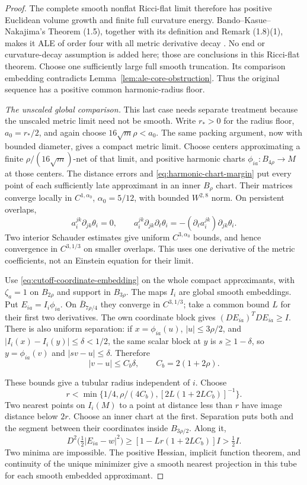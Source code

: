 \documentclass[11pt]{article}
\numberwithin{equation}{section}
\theoremstyle{definition}
\theoremstyle{remark}
\begin{document}
\begin{proof}
The complete smooth nonflat Ricci-flat limit therefore has
positive Euclidean volume growth and finite full curvature
energy. Bando--Kasue--Nakajima's Theorem (1.5), together with
its definition and Remark (1.8)(1), makes it ALE of order four
with all metric derivative decay
\cite[pp.~313--315, 335]{BandoKasueNakajima1989Coordinates}.
No end or curvature-decay assumption is added here; those are
conclusions in this Ricci-flat theorem. Choose one sufficiently
large full smooth truncation. Its comparison embedding contradicts
Lemma~\ref{lem:ale-core-obstruction}. Thus the original sequence
has a positive common harmonic-radius floor.

\emph{The unscaled global comparison.}
This last case needs separate treatment because the unscaled
metric limit need not be smooth. Write \(r_*>0\) for the radius
floor, \(a_0=r_*/2\), and again choose
\(16\sqrt m\rho<a_0\). The same packing argument, now with
bounded diameter, gives a compact metric limit. Choose centers
approximating a finite \(\rho/(16\sqrt m)\)-net of that limit,
and positive harmonic charts \(\phi_{ia}:B_{4\rho}\to M\)
at those centers. The distance errors and
\eqref{eq:harmonic-chart-margin} put every point of each sufficiently
late approximant in an inner \(B_\rho\) chart. Their matrices
converge locally in \(C^{1,\alpha_0}\), \(\alpha_0=5/12\),
with bounded \(W^{2,8}\) norm. On persistent overlaps,
\[
 a_i^{jk}\partial_{jk}\theta_i=0,\qquad
 a_i^{jk}\partial_{jk}\partial_\ell\theta_i
             =-(\partial_\ell a_i^{jk})\partial_{jk}\theta_i .
\]
Two interior Schauder estimates give uniform \(C^{3,\alpha_0}\)
bounds, and hence convergence in \(C^{3,1/3}\) on smaller
overlaps. This uses one derivative of the metric coefficients,
not an Einstein equation for their limit.

Use \eqref{eq:cutoff-coordinate-embedding} on the whole compact
approximants, with \(\zeta_a=1\) on \(B_{2\rho}\) and support
in \(B_{3\rho}\). The maps \(I_i\) are global smooth embeddings.
Put \(E_{ia}=I_i\phi_{ia}\). On \(\overline B_{7\rho/4}\)
they converge in \(C^{3,1/3}\); take a common bound \(L\)
for their first two derivatives. The own coordinate block gives
\((DE_{ia})^TDE_{ia}\ge I\). There is also uniform separation:
if \(x=\phi_{ia}(u)\), \(|u|\le3\rho/2\), and
\(|I_i(x)-I_i(y)|\le\delta<1/2\), the same scalar block
at \(y\) is \(s\ge1-\delta\), so \(y=\phi_{ia}(v)\)
and \(|sv-u|\le\delta\). Therefore
\[
 |v-u|\le C_b\delta,\qquad C_b=2(1+2\rho).
\]

These bounds give a tubular radius independent of \(i\).
Choose
\[
 r<\min\{1/4,\rho/(4C_b),[2L(1+2LC_b)]^{-1}\}.
\]
Two nearest points on \(I_i(M)\) to a point at distance less
than \(r\) have image distance below \(2r\). Choose an inner
chart at the first. Separation puts both and the segment
between their coordinates inside \(B_{3\rho/2}\). Along it,
\[
 D^2\bigl(\tfrac12|E_{ia}-w|^2\bigr)
       \ge[1-Lr(1+2LC_b)]I>\tfrac12 I.
\]
Two minima are impossible. The positive Hessian, implicit
function theorem, and continuity of the unique minimizer give
a smooth nearest projection in this tube for each smooth
embedded approximant.


\end{proof}
\end{document}
